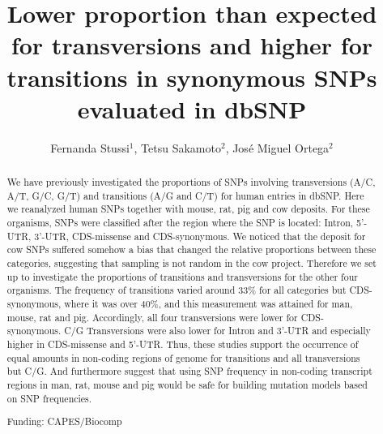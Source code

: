 \documentclass[twoside]{article}
\title{\vspace{-15mm}\fontsize{24pt}{10pt}\selectfont\textbf{Lower proportion than expected for transversions and higher for transitions in synonymous SNPs evaluated in dbSNP}} %
\author{Fernanda Stussi$^1$, Tetsu Sakamoto$^2$, Jos\'e Miguel Ortega$^2$}
\affil{1 UFMG\\ 2 UFMG, LABORAT\'ORIO DE BIODADOS\\ }
\date{}
\begin{document}
\maketitle %

\thispagestyle{fancy} %


\begin{abstract}
We have previously investigated the proportions of SNPs involving transversions (A/C, A/T, G/C, G/T) and transitions (A/G and C/T) for human entries in dbSNP. Here we reanalyzed human SNPs together with mouse, rat, pig and cow deposits. For these organisms, SNPs were classified after the region where the SNP is located: Intron, 5'-UTR, 3'-UTR, CDS-missense and CDS-synonymous. We noticed that the deposit for cow SNPs suffered somehow a bias that changed the relative proportions between these categories, suggesting that sampling is not random in the cow project. Therefore we set up to investigate the proportions of transitions and transversions for the other four organisms. The frequency of transitions varied around 33\% for all categories but CDS-synonymous, where it was over 40\%, and this measurement was attained for man, mouse, rat and pig. Accordingly, all four transversions were lower for CDS-synonymous. C/G Transversions were also lower for Intron and 3'-UTR and especially higher in CDS-missense and 5'-UTR. Thus, these studies support the occurrence of equal amounts in non-coding regions of genome for transitions and all transversions but C/G. And furthermore suggest that using SNP frequency in non-coding transcript regions in man, rat, mouse and pig would be safe for building mutation models based on SNP frequencies.

Funding: CAPES/Biocomp
\end{abstract}
\end{document}
